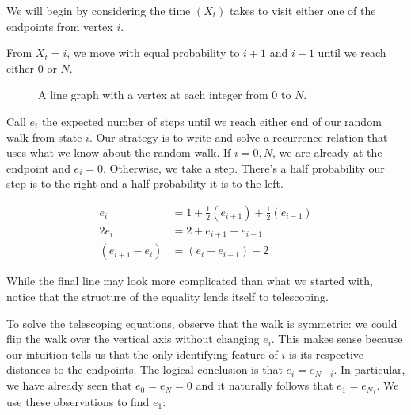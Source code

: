 \documentclass[12pt]{article}
\theoremstyle{definition}
\begin{document}
We will begin by considering the time $(X_t)$ takes to
visit either one of the endpoints from vertex $i$.

From $X_t=i$, we move with equal probability to $i+1$
and $i-1$ until we reach either $0$ or $N$.

\begin{figure}[ht]
	\centering
	\caption{A   line graph with a vertex at each integer from $0$ to $N$.}\label{fig:line}
\end{figure}

Call $e_i$ the expected number of steps until we reach either
end of our random walk from state $i$.
Our strategy is to write and solve a recurrence relation that
uses what we know about the random walk.
If $i=0,N$, we are already at the endpoint and $e_i=0$.
Otherwise, we take a step.
There's a half probability our step is to the right and
a half probability it is to the left.

\begin{align}
e_i &= 1 + \frac{1}{2} \left(e_{i+1}\right) + \frac{1}{2}\left(e_{i-1}\right) \nonumber \\
2 e_i &= 2 + e_{i+1} - e_{i-1} \nonumber \\
\left(e_{i+1} - e_i\right) &=\left( e_i - e_{i-1}\right) - 2 \nonumber
\end{align}

While the final line may look more complicated than what we started with,
notice that the structure of the equality lends itself to telescoping.

To solve the telescoping equations, observe that the walk is symmetric:
we could flip the walk over the vertical axis without changing $e_i$.
This makes sense because our intuition tells us that the only 
identifying feature of $i$ is its respective distances to the endpoints.
The logical conclusion is that $e_i=e_{N-i}$.
In particular, we have already seen that $e_0=e_N=0$ and it
naturally follows that $e_1=e_{N_1}$.
We use these observations to find $e_1$:
\end{document}
